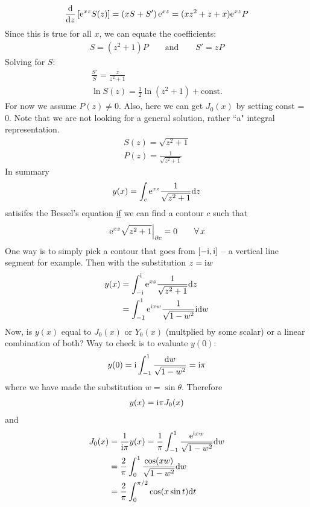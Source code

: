 \begin{align*}
	\frac{\mathrm{d}}{\mathrm{d} z} \left[\mathrm{e}^{xz} S(z)\right] = \left(x S + S'\right)\mathrm{e}^{xz}  = (xz^2 + z+x) \mathrm{e}^{xz} P
\end{align*}
Since this is true for all $x$, we can equate the coefficients:
\begin{align*}
	S = (z^2 + 1) P \qquad \text{and} \qquad 	S' = zP
\end{align*}
Solving for $S$:
\begin{gather*}
	\frac{S'}{S} = \frac{z}{z^2+1} \\
	\ln S(z) = \frac{1}{2} \ln (z^2+1) + \text{const.}
\end{gather*}
For now we assume $P(z) \neq 0$. Also, here we can get $J_0(x)$ by setting const = $0$. Note that we are not looking for a general solution, rather ``a" integral representation.
\begin{gather*}
	S(z) = \sqrt{z^2+1} \\
	P(z) = \frac{1}{\sqrt{z^2+1}}
\end{gather*}
In summary
\begin{gather*}
	y(x) = \int_c \mathrm{e}^{xz} \frac{1}{\sqrt{z^2+1}} \mathrm{d} z
\end{gather*}
satisifes the Bessel's equation \underline{if} we can find a contour $c$ such that
\begin{gather*}
	\left.\mathrm{e}^{xz} \sqrt{z^2+1} \right|_{\partial c} = 0 \qquad \forall \, x
\end{gather*}
One way is to simply pick a contour that goes from $[-\mathrm{i},\mathrm{i}]$ -- a vertical line segment for example. Then with the substitution $z = \mathrm{i} w$ 
\begin{align*}
	y(x) &= \int_{-\mathrm{i}}^{\mathrm{i}} \mathrm{e}^{xz} \frac{1}{\sqrt{z^2+1}} \mathrm{d} z \\
	&= \int_{-1}^{1} \mathrm{e}^{\mathrm{i} xw} \frac{1}{\sqrt{1-w^2}} \mathrm{i} \mathrm{d} w
\end{align*}
Now, is $y(x)$ equal to $J_0(x)$ or $Y_0(x)$ (multplied by some scalar) or a linear combination of both? Way to check is to evaluate $y(0)$:
\begin{gather*}
	y(0) = \mathrm{i} \int_{-1}^{1} \frac{\mathrm{d} w}{\sqrt{1 - w^2}} = \mathrm{i} \pi
\end{gather*} 
where we have made the substitution $w = \sin \theta$. Therefore
\begin{align*}
	y(x) = \mathrm{i} \pi J_0(x)
\end{align*}
and 
\begin{align*}
	J_0(x) &= \frac{1}{\mathrm{i} \pi} y(x) = \frac{1}{\pi} \int_{-1}^{1}  \frac{\mathrm{e}^{\mathrm{i} xw}}{\sqrt{1-w^2}} \mathrm{d} w \\
	&= \frac{2}{\pi} \int_{0}^{1} \frac{\cos (xw)}{\sqrt{1 - w^2}} \mathrm{d} w \\
	&= \frac{2}{\pi} \int_{0}^{\pi/2} \cos (x \sin t ) \mathrm{d} t
\end{align*}
